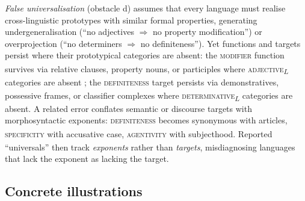 \documentclass[12pt]{article}
\begin{document}
\emph{False universalisation} (obstacle d) assumes that every language must realise cross-linguistic prototypes with similar formal properties, generating undergeneralisation (\enquote{no adjectives $ \Rightarrow$ no property modification}) or overprojection (\enquote{no determiners $\Rightarrow$ no definiteness}). Yet functions and targets persist where their prototypical categories are absent: the \textsc{modifier}\textsubscript{\Cross} function survives via relative clauses, property nouns, or participles where \textsc{adjective}\textsubscript{$L$} categories are absent \parencite{Dixon2010,Croft2001}; the \textsc{definiteness}\textsubscript{\Cross} target persists via demonstratives, possessive frames, or classifier complexes where \textsc{determinative}\textsubscript{$L$} categories are absent. A related error conflates semantic or discourse targets with morphosyntactic exponents: \textsc{definiteness}\textsubscript{\Cross} becomes synonymous with articles, \textsc{specificity}\textsubscript{\Cross} with accusative case, \textsc{agentivity}\textsubscript{\Cross} with subjecthood. Reported \enquote{universals} then track \emph{exponents} rather than \emph{targets}, misdiagnosing languages that lack the exponent as lacking the target.

\subsection{Concrete illustrations}\label{subsec:compressed}
\end{document}
